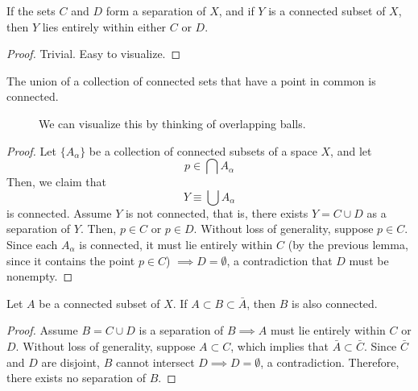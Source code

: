   \begin{lemma}
    If the sets $C$ and $D$ form a separation of $X$, and if $Y$ is a connected subset of $X$, then $Y$ lies entirely within either $C$ or $D$. 
  \end{lemma}
  \begin{proof}
    Trivial. Easy to visualize. 
  \end{proof}

  \begin{theorem}
    The union of a collection of connected sets that have a point in common is connected. 

    \begin{figure}[H]
      \centering 
      \caption{We can visualize this by thinking of overlapping balls. } 
      \label{fig:overlapping_circles}
    \end{figure}
  \end{theorem}
  \begin{proof}
    Let $\{A_\alpha\}$ be a collection of connected subsets of a space $X$, and let 
    \begin{equation}
      p \in \bigcap A_\alpha
    \end{equation}
    Then, we claim that 
    \begin{equation}
      Y \equiv \bigcup A_\alpha
    \end{equation}
    is connected. Assume $Y$ is not connected, that is, there exists $Y = C \cup D$ as a separation of $Y$. Then, $p \in C$ or $p \in D$. Without loss of generality, suppose $p \in C$. Since each $A_\alpha$ is connected, it must lie entirely within $C$ (by the previous lemma, since it contains the point $p \in C$) $\implies D = \emptyset$, a contradiction that $D$ must be nonempty. 
  \end{proof}

  \begin{theorem}
    Let $A$ be a connected subset of $X$. If $A \subset B \subset \bar{A}$, then $B$ is also connected. 
  \end{theorem}
  \begin{proof}
    Assume $B = C \cup D$ is a separation of $B \implies A$ must lie entirely within $C$ or $D$. Without loss of generality, suppose $A \subset C$, which implies that $\bar{A} \subset \bar{C}$. Since $\bar{C}$ and $D$ are disjoint, $B$ cannot intersect $D \implies D = \emptyset$, a contradiction. Therefore, there exists no separation of $B$. 
  \end{proof}

